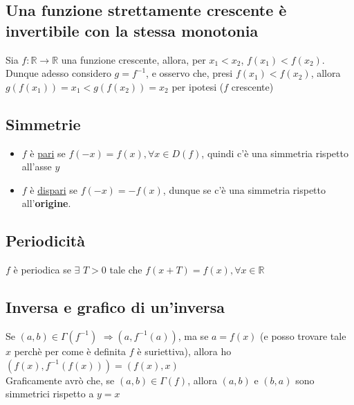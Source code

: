 \documentclass{article}
\theoremstyle{definition}
\newcommand{\R}{\mathbb{R}}
\begin{document}
\subsection{Una funzione strettamente crescente è invertibile con la stessa monotonia}
Sia $f:\R \to \R$ una funzione crescente, allora, per $x_1 < x_2$, $f(x_1)< f(x_2)$. Dunque adesso considero $g=f^{-1}$, e osservo che, presi $f(x_1) < f(x_2)$, allora $g(f(x_1))=x_1 < g(f(x_2))=x_2$ per ipotesi ($f$ crescente)
 
\subsection{Simmetrie}
\begin{itemize}
    \item $f$ è \underline{pari} se $f(-x)=f(x), \forall x \in D(f)$, quindi c'è una simmetria rispetto all'asse $y$
    \item $f$ è \underline{dispari} se $f(-x)=-f(x)$, dunque se c'è una simmetria rispetto all'\textbf{origine}.
\end{itemize}
    \subsection{Periodicità}
$f$ è periodica se $\exists \,\, T>0$ tale che $f(x+T)=f(x), \forall x \in \mathbb{R}$

\subsection{Inversa e grafico di un'inversa}
Se $(a,b) \in \Gamma (f^{-1}) \,\, \Longrightarrow (a,f^{-1}(a))$, ma se $a=f(x)$ (e posso trovare tale $x$ perchè per come è definita $f $ è suriettiva), allora ho $(f(x),f^{-1}(f(x)))=(f(x),x)$
\\
Graficamente avrò che, se $(a,b) \in \Gamma(f)$, allora $(a,b)$ e $(b,a)$ sono simmetrici rispetto a $y=x$
\begin{center}
\end{center}
\end{document}
